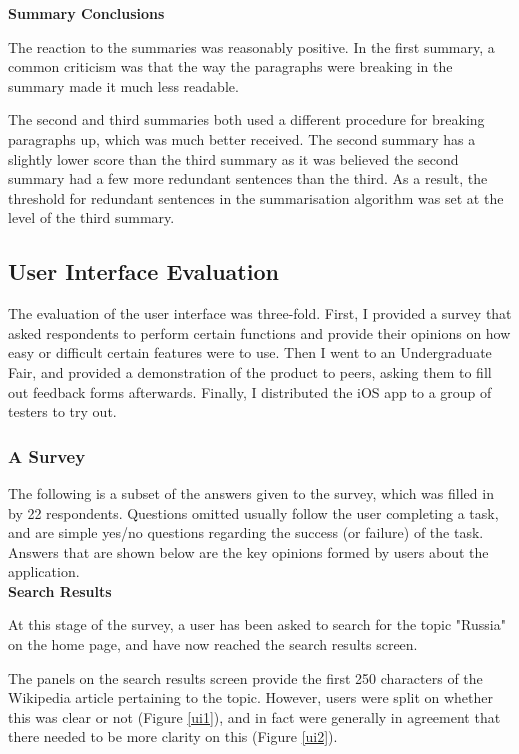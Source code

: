 \documentclass[12pt]{article}
\begin{document}
\textbf{Summary Conclusions}

The reaction to the summaries was reasonably positive. In the first summary, a common criticism was that the way the paragraphs were breaking in the summary made it much less readable. 

The second and third summaries both used a different procedure for breaking paragraphs up, which was much better received. The second summary has a slightly lower score than the third summary as it was believed the second summary had a few more redundant sentences than the third. As a result, the threshold for redundant sentences in the summarisation algorithm was set at the level of the third summary.

\subsection{User Interface Evaluation}

The evaluation of the user interface was three-fold. First, I provided a survey that asked respondents to perform certain functions and provide their opinions on how easy or difficult certain features were to use. Then I went to an Undergraduate Fair, and provided a demonstration of the product to peers, asking them to fill out feedback forms afterwards. Finally, I distributed the iOS app to a group of testers to try out. 

\subsubsection{A Survey}

The following is a subset of the answers given to the survey, which was filled in by 22 respondents. Questions omitted usually follow the user completing a task, and are simple yes/no questions regarding the success (or failure) of the task. Answers that are shown below are the key opinions formed by users about the application. \\

\textbf{Search Results}

At this stage of the survey, a user has been asked to search for the topic "Russia" on the home page, and have now reached the search results screen.

The panels on the search results screen provide the first 250 characters of the Wikipedia article pertaining to the topic. However, users were split on whether this was clear or not (Figure \ref{ui1}), and in fact were generally in agreement that there needed to be more clarity on this (Figure \ref{ui2}). 
\end{document}
